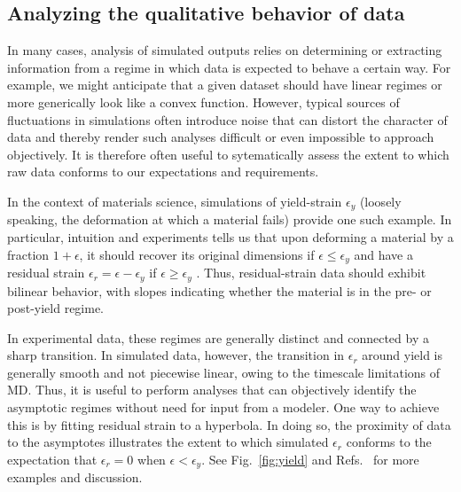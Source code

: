 \subsection{Analyzing the qualitative behavior of data}

In many cases, analysis of simulated outputs relies on determining or extracting information from a regime in which data is expected to behave a certain way.  For example, we might anticipate that a given dataset should have linear regimes or more generically look like a convex function.  However, typical sources of fluctuations in simulations often introduce noise that can distort the character of data and thereby render such analyses difficult or even impossible to approach objectively.  It is therefore often useful to sytematically assess the extent to which raw data conforms to our expectations and requirements.

In the context of materials science, simulations of yield-strain $\epsilon_y$ (loosely speaking, the deformation at which a material fails) provide one such example.  In particular, intuition and experiments tells us that upon deforming a material by a fraction $1+\epsilon$, it should recover its original dimensions if $\epsilon \le \epsilon_y$ and have a residual strain $\epsilon_r = \epsilon - \epsilon_y$ if $\epsilon \ge \epsilon_y$ \cite{patrone2}.  Thus, residual-strain data should exhibit bilinear behavior, with slopes indicating whether the material is in the pre- or post-yield regime.

In experimental data, these regimes are generally distinct and connected by a sharp transition.  In simulated data, however, the transition in $\epsilon_r$ around yield is generally smooth and not piecewise linear, owing to the timescale limitations of MD.  Thus, it is useful to perform analyses that can objectively identify the asymptotic regimes without need for input from a modeler.  One way to achieve this is by fitting residual strain to a hyperbola.  In doing so, the proximity of data to the asymptotes illustrates the extent to which simulated $\epsilon_r$ conforms to the expectation that $\epsilon_r=0$ when $\epsilon < \epsilon_y$.  See Fig.~\ref{fig:yield} and Refs.~\cite{patrone1,patrone2} for more examples and discussion.

